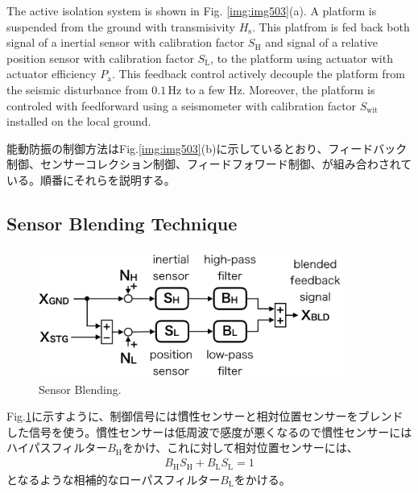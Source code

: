 The active isolation system is shown in Fig. \ref{img:img503}(a). A platform is suspended from the ground with transmisivity $H_{\mathrm{s}}$. This platfrom is fed back both signal of a inertial sensor with calibration factor $S_{\mathrm{H}}$ and signal of a relative position sensor with calibration factor $S_{\mathrm{L}}$, to the platform using actuator with actuator efficiency $P_{\mathrm{a}}$. This feedback control actively decouple the platform from the seismic disturbance from $0.1\,\mathrm{Hz}$ to a few Hz. Moreover, the platform is controled with feedforward using a seismometer with calibration factor $S_{\mathrm{wit}}$ installed on the local ground. 

能動防振の制御方法はFig.\ref{img:img503}(b)に示しているとおり、フィードバック制御、センサーコレクション制御、フィードフォワード制御、が組み合わされている。順番にそれらを説明する。

\subsection{Sensor Blending Technique}
\begin{figure}[h]
  \begin{center}   
    \includegraphics[width=10cm]{./img_chap5/img507.png}
    \caption{Sensor Blending.} \label{img:img507}
  \end{center}
\end{figure}

Fig.\ref{img:img507}に示すように、制御信号には慣性センサーと相対位置センサーをブレンドした信号を使う。慣性センサーは低周波で感度が悪くなるので慣性センサーにはハイパスフィルター$B_{\mathrm{H}}$をかけ、これに対して相対位置センサーには、
\begin{eqnarray}
  B_{\mathrm{H}}S_{\mathrm{H}} + B_{\mathrm{L}}S_{\mathrm{L}} = 1   \label{eq:eq506}
\end{eqnarray}
となるような相補的なローパスフィルター$B_{\mathrm{L}}$をかける。

